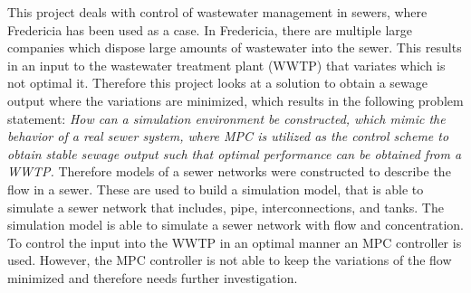 This project deals with control of wastewater management in sewers, where Fredericia has been used as a case. In Fredericia, there are multiple large companies which dispose large amounts of wastewater into the sewer. This results in an input to the wastewater treatment plant (WWTP) that variates which is not optimal it. Therefore this project looks at a solution to obtain a sewage output where the variations are minimized, which results in the following problem statement: \textit{How can a simulation environment be constructed, which mimic the behavior of a real sewer system, where MPC is utilized as the control scheme to obtain stable sewage output such that optimal performance can be obtained from a WWTP.} Therefore models of a sewer networks were constructed to describe the flow in a sewer. These are used to build a simulation model, that is able to simulate a sewer network that includes, pipe, interconnections, and tanks. The simulation model is able to simulate a sewer network with flow and concentration. To control the input into the WWTP in an optimal manner an MPC controller is used. However, the MPC controller is not able to keep the variations of the flow minimized and therefore needs further investigation.            








